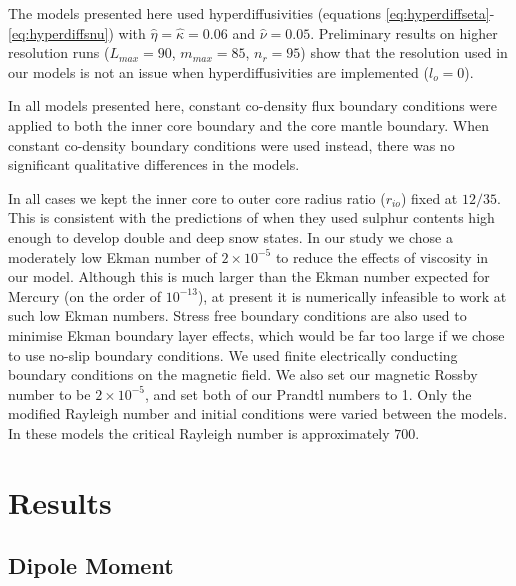 The models presented here used hyperdiffusivities (equations \ref{eq:hyperdiffseta}-\ref{eq:hyperdiffsnu}) with $\hat{\eta}=\hat{\kappa}=0.06$ and $\hat{\nu}=0.05$. Preliminary results on higher resolution runs ($L_{max}=90$, $m_{max}=85$, $n_{r}=95$) show that the resolution used in our models is not an issue when hyperdiffusivities are implemented ($l_{o}=0$).

In all models presented here, constant co-density flux boundary conditions were applied to both the inner core boundary and the core mantle boundary. When constant co-density boundary conditions were used instead, there was no significant qualitative differences in the models. 

In all cases we kept the inner core to outer core radius ratio ($r_{io}$) fixed at $12/35$. This is consistent with the predictions of \citet{hauck04} when they used sulphur contents high enough to develop double and deep snow states. In our study we chose a moderately low Ekman number of $2\times10^{-5}$ to reduce the effects of viscosity in our model. Although this is much larger than the Ekman number expected for Mercury (on the order of $10^{-13}$), at present it is numerically infeasible to work at such low Ekman numbers. Stress free boundary conditions are also used to minimise Ekman boundary layer effects, which would be far too large if we chose to use no-slip boundary conditions. We used finite electrically conducting boundary conditions on the magnetic field. We also set our magnetic Rossby number to be $2\times10^{-5}$, and set both of our Prandtl numbers to 1. Only the modified Rayleigh number  and initial conditions were varied between the models. In these models the critical Rayleigh number is approximately $700$.

\section{Results}
\subsection{Dipole Moment}

